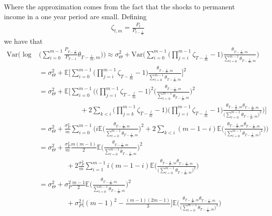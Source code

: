 Where the approximation comes from the fact that the shocks to permanent income in a one year period are small. Defining
\begin{align*}
\zeta_{t,m} = \frac{P_{t}}{P_{t-\frac{1}{m}}}
\end{align*}
we have that
\begin{align*}
\mathrm{Var}\Bigg(\log &\Bigg(\sum_{i=0}^{m-1} \frac{P_{T-\frac{i}{m}}}{P_{T-1}} \theta_{T-\frac{i}{m},m} \Bigg) \Bigg)
\approx \sigma^2_{\Theta} + \mathrm{Var}\Bigg( \sum_{i=0}^{m-1} \Big(\prod_{j=i}^{m-1} \zeta_{T-\frac{j}{m}}   -1\Big) \frac{\theta_{T-\frac{i}{m},m}}{\sum_{l=0}^{m-1} \theta_{T-\frac{l}{m},m}} \Bigg) \\
&= \sigma^2_{\Theta} + \mathbb{E}\Bigg[ \sum_{i=0}^{m-1} \Big(\prod_{j=i}^{m-1} \zeta_{T-\frac{j}{m}}   -1\Big) \frac{\theta_{T-\frac{i}{m},m}}{\sum_{l=0}^{m-1} \theta_{T-\frac{l}{m},m}} \Bigg]^2 \\
&= \sigma^2_{\Theta} + \mathbb{E}\Bigg[ \sum_{i=0}^{m-1} \Bigg( \Big(\prod_{j=i}^{m-1} \zeta_{T-\frac{j}{m}}   -1\Big)^2 \Bigg(\frac{\theta_{T-\frac{i}{m},m}}{\sum_{l=0}^{m-1} \theta_{T-\frac{l}{m},m}} \Bigg)^2 \\
& \qquad \qquad \qquad + 2 \sum_{k<i} \Big(\prod_{j=k}^{m-1} \zeta_{T-\frac{j}{m}}   -1\Big) \Big(\prod_{j=i}^{m-1} \zeta_{T-\frac{j}{m}}   -1\Big) \frac{\theta_{T-\frac{k}{m},m} \theta_{T-\frac{i}{m},m}}{\Big( \sum_{l=0}^{m-1} \theta_{T-\frac{l}{m},m} \Big)^2}  \Bigg) \Bigg] \\
&= \sigma^2_{\Theta} + \frac{\sigma^2_P}{m} \sum_{i=0}^{m-1} \Bigg( i\mathbb{E} \Bigg(\frac{\theta_{T-\frac{i}{m},m}}{\sum_{l=0}^{m-1} \theta_{T-\frac{l}{m},m}} \Bigg)^2  + 2 \sum_{k<i} (m-1-i)\mathbb{E}\Bigg( \frac{\theta_{T-\frac{k}{m},m} \theta_{T-\frac{i}{m},m}}{\Big( \sum_{l=0}^{m-1} \theta_{T-\frac{l}{m},m} \Big)^2} \Bigg) \Bigg)  \\
&= \sigma^2_{\Theta} + \frac{\sigma^2_P}{m} \frac{m(m-1)}{2}\mathbb{E} \Bigg(\frac{\theta_{T-\frac{i}{m},m}}{\sum_{l=0}^{m-1} \theta_{T-\frac{l}{m},m}} \Bigg)^2 \\
& \qquad \qquad + 2  \frac{\sigma^2_P}{m} \sum_{i=1}^{m-1} i (m-1-i)\mathbb{E}\Bigg( \frac{\theta_{T-\frac{k}{m},m} \theta_{T-\frac{i}{m},m}}{\Big( \sum_{l=0}^{m-1} \theta_{T-\frac{l}{m},m} \Big)^2} \Bigg)  \\
&= \sigma^2_{\Theta} + \sigma^2_P \frac{m-1}{2}\mathbb{E} \Bigg(\frac{\theta_{T-\frac{i}{m},m}}{\sum_{l=0}^{m-1} \theta_{T-\frac{l}{m},m}} \Bigg)^2 \\
& \qquad \qquad +   \sigma^2_P\Bigg[ (m-1)^2 - \frac{(m-1)(2m-1)}{3} \Bigg]\mathbb{E}\Bigg( \frac{\theta_{T-\frac{k}{m},m} \theta_{T-\frac{i}{m},m}}{\Big( \sum_{l=0}^{m-1} \theta_{T-\frac{l}{m},m} \Big)^2} \Bigg) 
\end{align*}
